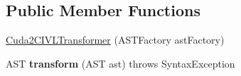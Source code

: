 \subsection*{Public Member Functions}
\begin{DoxyCompactItemize}
\item 
\hyperlink{classedu_1_1udel_1_1cis_1_1vsl_1_1civl_1_1transform_1_1IF_1_1Cuda2CIVLTransformer_ac8995df833a045409fc0145c1d52ca39}{Cuda2\+C\+I\+V\+L\+Transformer} (A\+S\+T\+Factory ast\+Factory)
\item 
\hypertarget{classedu_1_1udel_1_1cis_1_1vsl_1_1civl_1_1transform_1_1IF_1_1Cuda2CIVLTransformer_ab80ca8cfb1b075550479ff0c13f53bc5}{}A\+S\+T {\bfseries transform} (A\+S\+T ast)  throws Syntax\+Exception \label{classedu_1_1udel_1_1cis_1_1vsl_1_1civl_1_1transform_1_1IF_1_1Cuda2CIVLTransformer_ab80ca8cfb1b075550479ff0c13f53bc5}

\end{DoxyCompactItemize}
